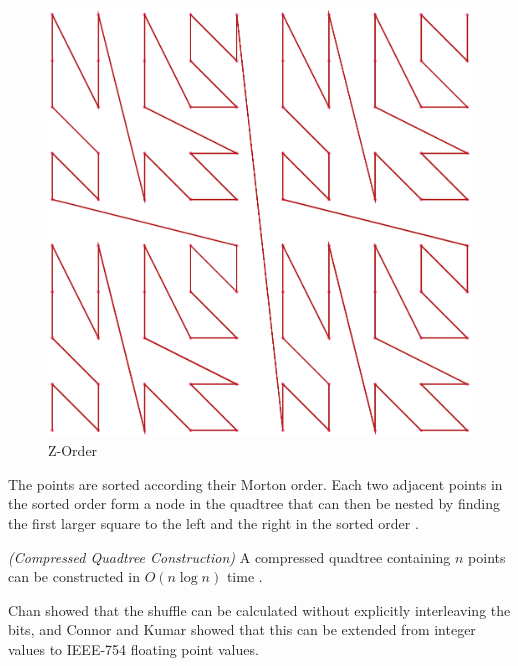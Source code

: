 \documentclass[mcs]{scsthesis}
\begin{document}
\begin{figure}
\begin{center}
\includegraphics[scale=0.35]{diagrams/zorder.eps}
\caption{Z-Order}
\label{fig:z_order}
\end{center}
\end{figure}

The points are sorted according their Morton order. Each two adjacent points in
the sorted order form a node in the quadtree that can then be nested by finding
the first larger square to the left and the right in the sorted order
\cite{bern}.

\begin{thm} \emph{(Compressed Quadtree Construction)}
A compressed quadtree containing $n$ points can be constructed in
\(O(n \log n)\) time \cite{bern}.
\end{thm}

Chan \cite{chan} showed that the shuffle can be calculated without explicitly
interleaving the bits, and Connor and Kumar \cite{connor} showed that this can
be extended from integer values to IEEE-754 floating point values.
\end{document}
